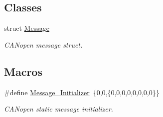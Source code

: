 \subsection*{Classes}
\begin{DoxyCompactItemize}
\item 
struct \mbox{\hyperlink{struct_message}{Message}}
\begin{DoxyCompactList}\small\item\em C\+A\+Nopen message struct. \end{DoxyCompactList}\end{DoxyCompactItemize}
\subsection*{Macros}
\begin{DoxyCompactItemize}
\item 
\mbox{\label{group___c_a_n__network__module_gaf21e24a8e9f1bf113b5efb16d5ab924b}} 
\#define \mbox{\hyperlink{group___c_a_n__network__module_gaf21e24a8e9f1bf113b5efb16d5ab924b}{Message\+\_\+\+Initializer}}~\{0,0,\{0,0,0,0,0,0,0,0\}\}
\begin{DoxyCompactList}\small\item\em C\+A\+Nopen static message initializer. \end{DoxyCompactList}\end{DoxyCompactItemize}
